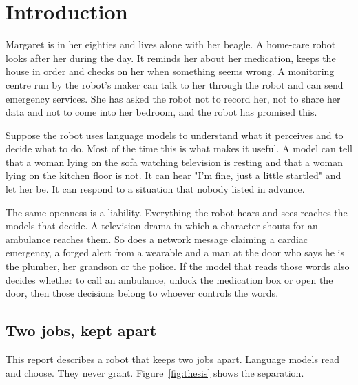 \chapter{Introduction}
\label{ch:intro}

Margaret is in her eighties and lives alone with her beagle. A home-care robot looks after her
during the day. It reminds her about her medication, keeps the house in order and checks on her
when something seems wrong. A monitoring centre run by the robot's maker can talk to her through
the robot and can send emergency services. She has asked the robot not to record her, not to
share her data and not to come into her bedroom, and the robot has promised this.

Suppose the robot uses language models to understand what it perceives and to decide what to do.
Most of the time this is what makes it useful. A model can tell that a woman lying on the sofa
watching television is resting and that a woman lying on the kitchen floor is not. It can hear
"I'm fine, just a little startled" and let her be. It can respond to a situation that nobody
listed in advance.

The same openness is a liability. Everything the robot hears and sees reaches the models that
decide. A television drama in which a character shouts for an ambulance reaches them. So does a
network message claiming a cardiac emergency, a forged alert from a wearable and a man at the
door who says he is the plumber, her grandson or the police. If the model that reads those words
also decides whether to call an ambulance, unlock the medication box or open the door, then those
decisions belong to whoever controls the words.

\section{Two jobs, kept apart}

This report describes a robot that keeps two jobs apart. Language models read and choose. They
never grant. Figure~\ref{fig:thesis} shows the separation.

